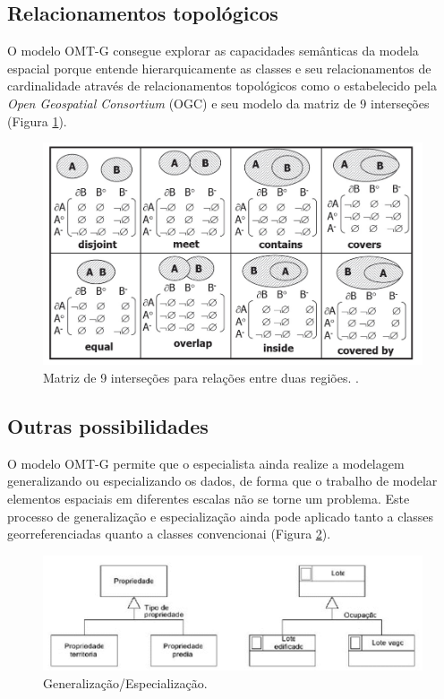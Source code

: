 		\subsection{Relacionamentos topológicos}
		
		O modelo OMT-G consegue explorar as capacidades semânticas da modela espacial porque entende hierarquicamente as classes e seu relacionamentos de cardinalidade através de relacionamentos topológicos como o estabelecido pela \textit{Open Geospatial Consortium} (OGC) e seu modelo da matriz de 9 interseções (Figura \ref{fig:relactopologicos}).
		
		\begin{figure} [h]
			\centering
			\includegraphics[width=1\linewidth]{data/relac_topologicos}
			\caption{Matriz de 9 interseções para relações entre duas regiões. \cite{EGENHOFER_91}.}
			\label{fig:relactopologicos}
		\end{figure}
		
		\subsection{Outras possibilidades}
		
		O modelo OMT-G permite que o especialista ainda realize a modelagem generalizando ou especializando os dados, de forma que o trabalho de modelar elementos espaciais em diferentes escalas não se torne um problema. Este processo de generalização e especialização ainda pode aplicado tanto a classes georreferenciadas quanto a classes convencionai (Figura \ref{fig:generalizacaoespecializacao}). 
		
		\begin{figure} [h]
			\centering
			\includegraphics[width=1\linewidth]{data/generalizacao_especializacao}
			\caption{Generalização/Especialização. \cite{BORGES_etal05}}
			\label{fig:generalizacaoespecializacao}
		\end{figure}
		
